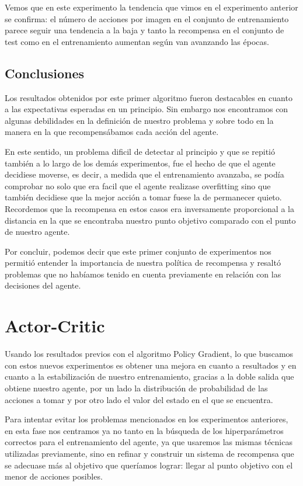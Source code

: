 Vemos que en este experimento la tendencia que vimos en el experimento anterior se confirma: el número de acciones por imagen en el conjunto de entrenamiento parece seguir una tendencia a la baja y tanto la recompensa en el conjunto de test como en el entrenamiento aumentan según van avanzando las épocas.
\medskip

\subsection{Conclusiones}
\label{resultados-policy-gradient-conclusiones}

Los resultados obtenidos por este primer algoritmo fueron destacables en cuanto a las expectativas esperadas en un principio. Sin embargo nos encontramos con algunas debilidades en la definición de nuestro problema y sobre todo en la manera en la que recompensábamos cada acción del agente.
\medskip

En este sentido, un problema dificil de detectar al principio y que se repitió también a lo largo de los demás experimentos, fue el hecho de que el agente decidiese moverse, es decir, a medida que el entrenamiento avanzaba, se podía comprobar no solo que era facil que el agente realizase overfitting sino que también decidiese que la mejor acción a tomar fuese la de permanecer quieto. Recordemos que la recompensa en estos casos era inversamente proporcional a la distancia en la que se encontraba nuestro punto objetivo comparado con el punto de nuestro agente.
\medskip

Por concluir, podemos decir que este primer conjunto de experimentos nos permitió entender la importancia de nuestra política de recompensa y resaltó problemas que no habíamos tenido en cuenta previamente en relación con las decisiones del agente.
\medskip


\section{Actor-Critic}
\label{resultados-actor-critic}

Usando los resultados previos con el algoritmo Policy Gradient, lo que buscamos con estos nuevos experimentos es obtener una mejora en cuanto a resultados y en cuanto a la estabilización de nuestro entrenamiento, gracias a la doble salida que obtiene nuestro agente, por un lado la distribución de probabilidad de las acciones a tomar y por otro lado el valor del estado en el que se encuentra.
\medskip

Para intentar evitar los problemas mencionados en los experimentos anteriores, en esta fase nos centramos ya no tanto en la búsqueda de los hiperparámetros correctos para el entrenamiento del agente, ya que usaremos las mismas técnicas utilizadas previamente, sino en refinar y construir un sistema de recompensa que se adecuase más al objetivo que queríamos lograr: llegar al punto objetivo con el menor de acciones posibles.
\medskip


